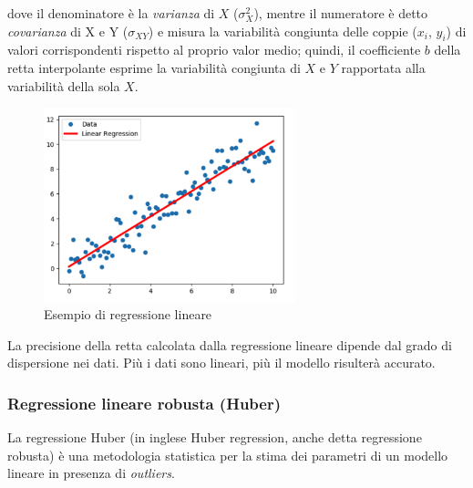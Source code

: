 dove il denominatore è la \textit{varianza} di $X$ ($\sigma_{X}^{2}$), mentre il numeratore è detto \textit{covarianza} di X e Y ($\sigma_{XY}$) e misura la variabilità congiunta delle coppie ($x_i$, $y_i$) di valori corrispondenti rispetto al proprio valor medio; quindi, il coefficiente $b$ della retta interpolante esprime la variabilità congiunta di $X$ e $Y$ rapportata alla variabilità della sola $X$. \cite{Neter1996}

\begin{figure}[H]
\centering
\includegraphics[width=0.65\textwidth,height=\textheight,keepaspectratio]{img/lin_reg_example.png}
\caption{Esempio di regressione lineare}
\label{fig:reg_lin}
\end{figure}

La precisione della retta calcolata dalla regressione lineare dipende dal grado di dispersione nei dati. Più i dati sono lineari, più il modello risulterà accurato.

%
%
%

\subsubsection{Regressione lineare robusta (Huber)}\label{sssec:regressione-huber}
La regressione Huber (in inglese Huber regression, anche detta regressione robusta) è una metodologia statistica per la stima dei parametri di un modello lineare in presenza di \textit{outliers}.

